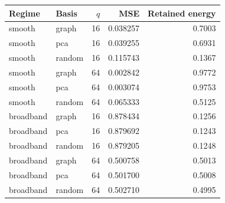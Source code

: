\begin{tabular}{llrrr}\toprule
Regime & Basis & $q$ & MSE & Retained energy \\\midrule
smooth & graph & 16 & 0.038257 & 0.7003 \\
smooth & pca & 16 & 0.039255 & 0.6931 \\
smooth & random & 16 & 0.115743 & 0.1367 \\
smooth & graph & 64 & 0.002842 & 0.9772 \\
smooth & pca & 64 & 0.003074 & 0.9753 \\
smooth & random & 64 & 0.065333 & 0.5125 \\
broadband & graph & 16 & 0.878434 & 0.1256 \\
broadband & pca & 16 & 0.879692 & 0.1243 \\
broadband & random & 16 & 0.879205 & 0.1248 \\
broadband & graph & 64 & 0.500758 & 0.5013 \\
broadband & pca & 64 & 0.501700 & 0.5008 \\
broadband & random & 64 & 0.502710 & 0.4995 \\
\bottomrule\end{tabular}
